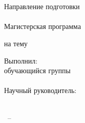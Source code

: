 \thispagestyle{empty}
\begin{center}
\thesisOrganization\\
\thesisInstitute\\
\thesisDepartment
\end{center}

\vspace{2\baselineskip}

\begin{flushleft}
Направление подготовки \thesisProgramCode\\
\thesisProgramTitle\\
Магистерская программа \thesisProgramProfile
\end{flushleft}

\vfill

\begin{center}
\thesisType
\end{center}

\vspace{\baselineskip}

\begin{center}
на тему
\end{center}

\vspace{\baselineskip}

\begin{center}
\textbf{\thesisTitle}
\end{center}

\vfill

\begin{flushright}
\begin{minipage}{0.52\textwidth}
Выполнил:\\
обучающийся группы \thesisStudentGroup\\
\thesisAuthor\\[2\baselineskip]
Научный руководитель:\\
\supervisorPosition\\
\supervisorFio
\end{minipage}
\end{flushright}

\vfill

\begin{center}
\thesisCity~-- \thesisYear
\end{center}
